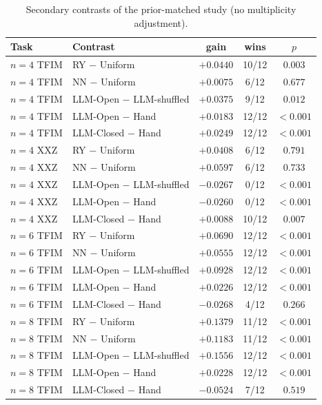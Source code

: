\documentclass[11pt]{article}
\begin{document}
\begin{table}[h]
\centering\small
\caption{Secondary contrasts of the prior-matched study (no multiplicity adjustment).}
\begin{tabular}{llccc}
\toprule
Task & Contrast & gain & wins & $p$\\
\midrule
$n{=}4$ TFIM & RY $-$ Uniform & $+0.0440$ & 10/12 & $0.003$ \\
$n{=}4$ TFIM & NN $-$ Uniform & $+0.0075$ & 6/12 & $0.677$ \\
$n{=}4$ TFIM & LLM-Open $-$ LLM-shuffled & $+0.0375$ & 9/12 & $0.012$ \\
$n{=}4$ TFIM & LLM-Open $-$ Hand & $+0.0183$ & 12/12 & $<0.001$ \\
$n{=}4$ TFIM & LLM-Closed $-$ Hand & $+0.0249$ & 12/12 & $<0.001$ \\
$n{=}4$ XXZ & RY $-$ Uniform & $+0.0408$ & 6/12 & $0.791$ \\
$n{=}4$ XXZ & NN $-$ Uniform & $+0.0597$ & 6/12 & $0.733$ \\
$n{=}4$ XXZ & LLM-Open $-$ LLM-shuffled & $-0.0267$ & 0/12 & $<0.001$ \\
$n{=}4$ XXZ & LLM-Open $-$ Hand & $-0.0260$ & 0/12 & $<0.001$ \\
$n{=}4$ XXZ & LLM-Closed $-$ Hand & $+0.0088$ & 10/12 & $0.007$ \\
$n{=}6$ TFIM & RY $-$ Uniform & $+0.0690$ & 12/12 & $<0.001$ \\
$n{=}6$ TFIM & NN $-$ Uniform & $+0.0555$ & 12/12 & $<0.001$ \\
$n{=}6$ TFIM & LLM-Open $-$ LLM-shuffled & $+0.0928$ & 12/12 & $<0.001$ \\
$n{=}6$ TFIM & LLM-Open $-$ Hand & $+0.0226$ & 12/12 & $<0.001$ \\
$n{=}6$ TFIM & LLM-Closed $-$ Hand & $-0.0268$ & 4/12 & $0.266$ \\
$n{=}8$ TFIM & RY $-$ Uniform & $+0.1379$ & 11/12 & $<0.001$ \\
$n{=}8$ TFIM & NN $-$ Uniform & $+0.1183$ & 11/12 & $<0.001$ \\
$n{=}8$ TFIM & LLM-Open $-$ LLM-shuffled & $+0.1556$ & 12/12 & $<0.001$ \\
$n{=}8$ TFIM & LLM-Open $-$ Hand & $+0.0228$ & 12/12 & $<0.001$ \\
$n{=}8$ TFIM & LLM-Closed $-$ Hand & $-0.0524$ & 7/12 & $0.519$ \\
\bottomrule
\end{tabular}
\end{table}
\end{document}
